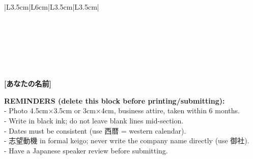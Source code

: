 \documentclass[a4paper,10pt]{article}
\begin{document}
\begin{tabular}{|L{3.5cm}|L{6cm}|L{3.5cm}|L{3.5cm}|}
{  } \\ \hline
   \\ \hline
   \\ \hline
   \\ \hline
   \\ \hline
   \\ \hline
   \\ \hline
\end{tabular}

\vspace{6pt}
\begin{flushright}
  {\bfseries [あなたの名前]}
\end{flushright}

\vspace{4pt}
{\tiny \color{thin}
\textbf{REMINDERS (delete this block before printing/submitting):}\\
- Photo 4.5cm×3.5cm or 3cm×4cm, business attire, taken within 6 months.\\
- Write in black ink; do not leave blank lines mid-section.\\
- Dates must be consistent (use 西暦 = western calendar).\\
- 志望動機 in formal keigo; never write the company name directly (use 御社).\\
- Have a Japanese speaker review before submitting.
}
\end{document}
